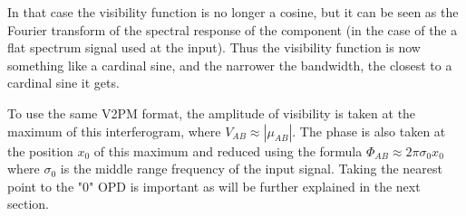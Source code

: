 In that case the visibility function is no longer a cosine, but it can be seen as the Fourier transform of the spectral response of the component (in the case of the a flat spectrum signal used at the input). Thus the visibility function is now something like a cardinal sine, and the narrower the bandwidth, the closest to a cardinal sine it gets.

To use the same V2PM format, the amplitude of visibility is taken at the maximum of this interferogram, where $V_{AB} \approx \left|\mu_{AB}\right|$. The phase is also taken at the position $x_0$ of this maximum and reduced using the formula $\Phi_{AB} \approx 2\pi\sigma_0 x_0$ where $\sigma_0$ is the middle range frequency of the input signal. Taking the nearest point to the "0" OPD is important as will be further explained in the next section.  
